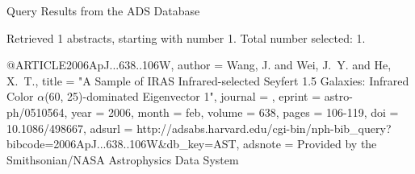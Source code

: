 Query Results from the ADS Database


Retrieved 1 abstracts, starting with number 1.  Total number selected: 1.

@ARTICLE{2006ApJ...638..106W,
   author = {{Wang}, J. and {Wei}, J.~Y. and {He}, X.~T.},
    title = "{A Sample of IRAS Infrared-selected Seyfert 1.5 Galaxies: Infrared Color {$\alpha$}(60, 25)-dominated Eigenvector 1}",
  journal = {\apj},
   eprint = {astro-ph/0510564},
     year = 2006,
    month = feb,
   volume = 638,
    pages = {106-119},
      doi = {10.1086/498667},
   adsurl = {http://adsabs.harvard.edu/cgi-bin/nph-bib_query?bibcode=2006ApJ...638..106W&db_key=AST},
  adsnote = {Provided by the Smithsonian/NASA Astrophysics Data System}
}


